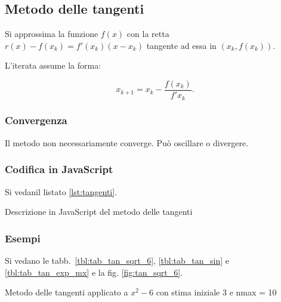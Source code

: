 \subsection{Metodo delle tangenti}

Si approssima la funzione $f(x)$ con la retta $r(x) - f(x_k) = f'(x_k) (x - x_k)$ tangente ad essa in $(x_k, f(x_k))$.

L'iterata assume la forma:

$$x_{k+1} = x_k - \frac{f(x_k)}{f'{x_k}}.$$

\subsubsection{Convergenza}

Il metodo non necessariamente converge.
Può oscillare o divergere.

\subsubsection{Codifica in JavaScript}


Si vedanil listato \ref{lst:tangenti}.

\begin{lstfloat}
    
    \caption{Descrizione in JavaScript del metodo delle tangenti}
    \label{lst:tangenti}
\end{lstfloat}

\subsubsection{Esempi}

Si vedano le tabb.~\ref{tbl:tab_tan_sqrt_6}, \ref{tbl:tab_tan_sin} e \ref{tbl:tab_tan_exp_mx} e la fig. \ref{fig:tan_sqrt_6}.

\begin{table}
    \begin{center}
\end{center}        
\caption[]{Metodo delle tangenti applicato a $x^2 -6$ con stima iniziale 3 e nmax = 10}
\end{table}

